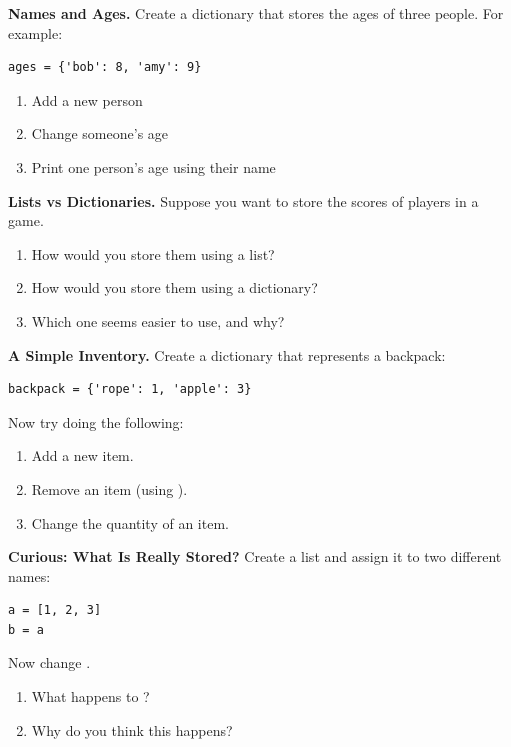 \begin{exercises}
\item \textcolor{TermSage}{\bfseries\sffamily Names and Ages.}
Create a dictionary that stores the ages of three people.
For example:
\begin{lstlisting}
ages = {'bob': 8, 'amy': 9}
\end{lstlisting}
\begin{enumerate}
  \item Add a new person
  \item Change someone's age
  \item Print one person's age using their name
\end{enumerate}

\item \textcolor{TermSage}{\bfseries\sffamily Lists vs Dictionaries.}
Suppose you want to store the scores of players in a game.
\begin{enumerate}
  \item How would you store them using a list?
  \item How would you store them using a dictionary?
  \item Which one seems easier to use, and why?
\end{enumerate}

\item \textcolor{TermSage}{\bfseries\sffamily A Simple Inventory.}
Create a dictionary that represents a backpack:
\begin{lstlisting}
backpack = {'rope': 1, 'apple': 3}
\end{lstlisting}
Now try doing the following:
\begin{enumerate}
  \item Add a new item.
  \item Remove an item (using ).
  \item Change the quantity of an item.
\end{enumerate}

\item \textcolor{TermSage}{\bfseries\sffamily Curious: What Is Really Stored?}
Create a list and assign it to two different names:
\begin{lstlisting}
a = [1, 2, 3]
b = a
\end{lstlisting}
Now change .
\begin{enumerate}
  \item What happens to ?
  \item Why do you think this happens?
\end{enumerate}


\end{exercises}
